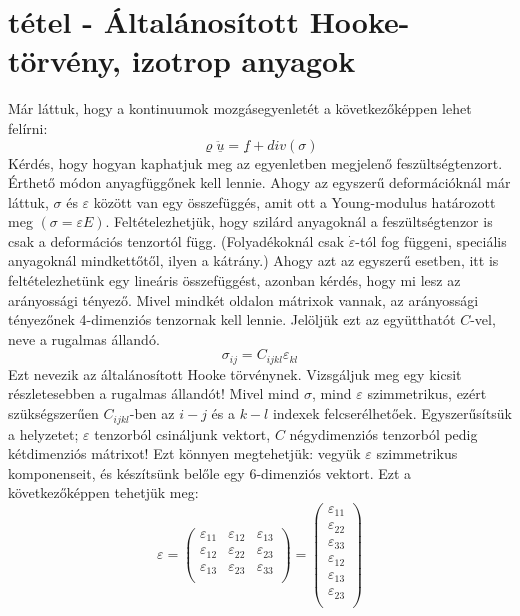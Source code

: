 \documentclass[a4paper,12pt]{article}
\begin{document}
\section{tétel - Általánosított Hooke-törvény, izotrop anyagok}
Már láttuk, hogy a kontinuumok mozgásegyenletét a következőképpen lehet felírni:
\begin{equation}
\varrho\ddot{\underline{u}}=\underline{f}+div(\sigma)
\end{equation}
Kérdés, hogy hogyan kaphatjuk meg az egyenletben megjelenő feszültségtenzort. Érthető módon anyagfüggőnek kell lennie. Ahogy az egyszerű deformációknál már láttuk, $\sigma$ és $\varepsilon$ között van egy összefüggés, amit ott a Young-modulus határozott meg $(\sigma=\varepsilon E)$. Feltételezhetjük, hogy szilárd anyagoknál a feszültségtenzor is csak a deformációs tenzortól függ. (Folyadékoknál csak $\dot{\varepsilon}$-tól fog függeni, speciális anyagoknál mindkettőtől, ilyen a kátrány.) Ahogy azt az egyszerű esetben, itt is feltételezhetünk egy lineáris összefüggést, azonban kérdés, hogy mi lesz az arányossági tényező. Mivel mindkét oldalon mátrixok vannak, az arányossági tényezőnek 4-dimenziós tenzornak kell lennie. Jelöljük ezt az együtthatót $C$-vel, neve a rugalmas állandó.
\begin{equation}
\sigma_{ij}=C_{ijkl}\varepsilon_{kl}
\end{equation}
Ezt nevezik az általánosított Hooke törvénynek. Vizsgáljuk meg egy kicsit részletesebben a rugalmas állandót! Mivel mind $\sigma$, mind $\varepsilon$ szimmetrikus, ezért szükségszerűen $C_{ijkl}$-ben az $i-j$ és a $k-l$ indexek felcserélhetőek. Egyszerűsítsük a helyzetet; $\varepsilon$ tenzorból csináljunk vektort, $C$ négydimenziós tenzorból pedig kétdimenziós mátrixot! Ezt könnyen megtehetjük: vegyük $\varepsilon$ szimmetrikus komponenseit, és készítsünk belőle egy 6-dimenziós vektort. Ezt a következőképpen tehetjük meg:
\begin{equation}
\varepsilon=\begin{pmatrix}
\varepsilon_{11} & \varepsilon_{12} & \varepsilon_{13} \\
\varepsilon_{12} & \varepsilon_{22} & \varepsilon_{23} \\
\varepsilon_{13} & \varepsilon_{23} & \varepsilon_{33} \\
\end{pmatrix}=
\begin{pmatrix}
\varepsilon_{11} \\
\varepsilon_{22} \\
\varepsilon_{33} \\
\varepsilon_{12} \\
\varepsilon_{13} \\
\varepsilon_{23} \\
\end{pmatrix}
\end{equation}
\end{document}
